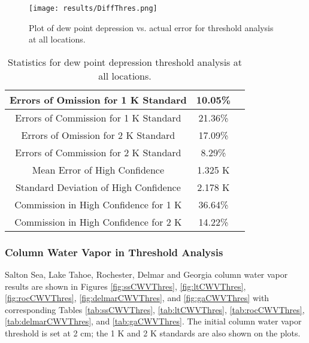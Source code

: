 \documentclass{book}
\begin{document}
\begin{minipage}[c]{0.47\textwidth}
\centering
\begin{figure}[H]
\texttt{[image: results/DiffThres.png]}
\caption{Plot of dew point depression vs. actual error for threshold analysis at all locations.}
\label{fig:DiffThres}
\end{figure}
\end{minipage}
\begin{minipage}[c]{0.47\textwidth}
\begin{table}[H]
\centering
\footnotesize
\begin{tabular}{ | c | c | c | } \hline
Errors of Omission for 1 K Standard & 10.05\% \\ \hline
Errors of Commission for 1 K Standard & 21.36\% \\ \hline
Errors of Omission for 2 K Standard & 17.09\% \\ \hline
Errors of Commission for 2 K Standard & 8.29\% \\ \hline
Mean Error of High Confidence & 1.325 K \\ \hline
Standard Deviation of High Confidence & 2.178 K \\ \hline
Commission in High Confidence for 1 K & 36.64\% \\ \hline
Commission in High Confidence for 2 K & 14.22\% \\ \hline
\end{tabular}
\caption{Statistics for dew point depression threshold analysis at all locations.}
\label{tab:DiffThres}
\end{table}
\end{minipage}

\subsubsection{Column Water Vapor in Threshold Analysis}

Salton Sea, Lake Tahoe, Rochester, Delmar and Georgia column water vapor results are shown in Figures \ref{fig:ssCWVThres}, \ref{fig:ltCWVThres}, \ref{fig:rocCWVThres}, \ref{fig:delmarCWVThres}, and \ref{fig:gaCWVThres} with corresponding Tables \ref{tab:ssCWVThres}, \ref{tab:ltCWVThres}, \ref{tab:rocCWVThres}, \ref{tab:delmarCWVThres}, and \ref{tab:gaCWVThres}.  The initial column water vapor threshold is set at 2 cm; the 1 K and 2 K standards are also shown on the plots.
\end{document}
